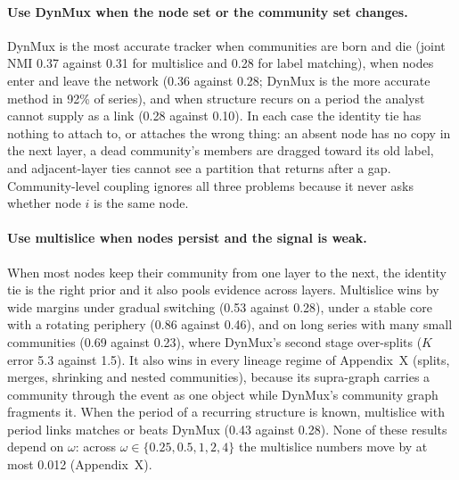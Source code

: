 \paragraph{Use DynMux when the node set or the community set changes.}
DynMux is the most accurate tracker when communities are born and die
(joint NMI 0.37 against 0.31 for multislice and 0.28 for label matching),
when nodes enter and leave the network (0.36 against 0.28; DynMux is the more
accurate method in 92\% of series), and when structure recurs on a period
the analyst cannot supply as a link (0.28 against 0.10). In each case the
identity tie has nothing to attach to, or attaches the wrong thing: an
absent node has no copy in the next layer, a dead community's members are
dragged toward its old label, and adjacent-layer ties cannot see a
partition that returns after a gap. Community-level coupling ignores all
three problems because it never asks whether node $i$ is the same node.

\paragraph{Use multislice when nodes persist and the signal is weak.}
When most nodes keep their community from one layer to the next, the
identity tie is the right prior and it also pools evidence across layers.
Multislice wins by wide margins under gradual switching (0.53 against 0.28),
under a stable core with a rotating periphery (0.86 against 0.46), and on
long series with many small communities (0.69 against 0.23), where DynMux's
second stage over-splits ($K$ error 5.3 against 1.5). It also wins in every
lineage regime of Appendix~X (splits, merges, shrinking and nested
communities), because its supra-graph carries a community through the event
as one object while DynMux's community graph fragments it. When the period
of a recurring structure is known, multislice with period links matches or
beats DynMux (0.43 against 0.28). None of these results depend on $\omega$:
across $\omega \in \{0.25, 0.5, 1, 2, 4\}$ the multislice numbers move by
at most 0.012 (Appendix~X).

